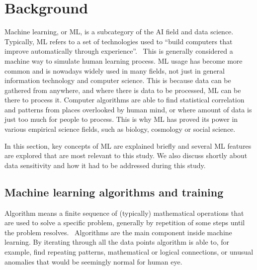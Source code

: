 

\section{Background}\label{sec:background}

Machine learning, or ML,
is a subcategory of the AI field and data science.
Typically, ML refers to
a set of technologies used to \enquote{build computers
that improve automatically through experience}.~\cite{jordan2015machine}
This is generally considered a machine way
to simulate human learning process.
ML usage has become more common
and is nowadays widely used in many fields,
not just in general information technology and computer science.
This is because data can be gathered from anywhere,
and where there is data to be processed,
ML can be there to process it.
Computer algorithms are able to find 
statistical correlation and patterns
from places overlooked by human mind,
or where amount of data is just too much 
for people to process.
This is why ML has proved its power
in various empirical science fields,
such as biology, cosmology or social science.~\cite{jordan2015machine}

In this section, 
key concepts of ML are explained briefly
and several ML features are explored 
that are most relevant to this study.
We also discuss shortly about data sensitivity
and how it had to be addressed during this study.



\subsection{Machine learning algorithms and training}\label{subsec:bg-machine-learning}

Algorithm means a finite sequence of (typically) mathematical operations
that are used to solve a specific problem,
generally by repetition of some steps
until the problem resolves.~\cite{merriam2022algorithm}
Algorithms are the main component inside machine learning.
By iterating through all the data points
algorithm is able to, for example,
find repeating patterns,
mathematical or logical connections,
or unusual anomalies that would be seemingly normal for human eye.

